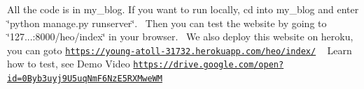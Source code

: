 All the code is in my\+\_\+blog. If you want to run locally, cd into my\+\_\+blog and enter \char`\"{}python manage.\+py runserver\char`\"{}.~\newline
 Then you can test the website by going to \char`\"{}127...\+:8000/heo/index\char`\"{} in your browser.~\newline
 We also deploy this website on heroku, you can goto \href{https://young-atoll-31732.herokuapp.com/heo/index/}{\tt https\+://young-\/atoll-\/31732.\+herokuapp.\+com/heo/index/} ~\newline
 Learn how to test, see Demo Video \href{https://drive.google.com/open?id=0Byb3uyj9U5uqNmF6NzE5RXMweWM}{\tt https\+://drive.\+google.\+com/open?id=0\+Byb3uyj9\+U5uq\+Nm\+F6\+Nz\+E5\+R\+X\+Mwe\+W\+M} ~\newline
 